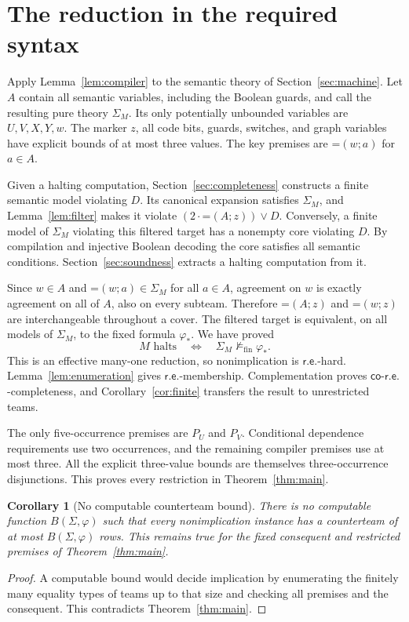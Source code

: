 \documentclass[11pt,a4paper]{article}
\newcommand{\dep}[2]{\mathord{=}(#1;#2)}
\newcommand{\fin}{\mathrm{fin}}
\newcommand{\RE}{\mathsf{r.e.}}
\newcommand{\coRE}{\mathsf{co\text{-}r.e.}}
\newtheorem{corollary}[theorem]{Corollary}
\theoremstyle{definition}
\begin{document}
\section{The reduction in the required syntax}
\label{sec:reduction}
Apply Lemma~\ref{lem:compiler} to the semantic theory of
Section~\ref{sec:machine}. Let $A$ contain all semantic variables,
including the Boolean guards, and call the resulting pure theory
$\Sigma_M$. Its only potentially unbounded variables are
$U,V,X,Y,w$. The marker $z$, all code bits, guards, switches, and
graph variables have explicit bounds of at most three values.
The key premises are $\dep w a$ for $a\in A$.

Given a halting computation, Section~\ref{sec:completeness} constructs
a finite semantic model violating $D$. Its canonical expansion
satisfies $\Sigma_M$, and Lemma~\ref{lem:filter} makes it violate
$(2\cdot\dep Az)\vee D$.
Conversely, a finite model of $\Sigma_M$ violating this filtered
target has a nonempty core violating $D$. By compilation and
injective Boolean decoding the core satisfies all semantic
conditions. Section~\ref{sec:soundness} extracts a halting
computation from it.

Since $w\in A$ and $\dep w a\in\Sigma_M$ for all $a\in A$, agreement on $w$
is exactly agreement on all of $A$, also on every subteam. Therefore
$\dep Az$ and $\dep wz$ are interchangeable throughout a cover.
The filtered target is equivalent, on all models of $\Sigma_M$,
to the fixed formula $\varphi_*$. We have proved
\[
 M\text{ halts}
 \quad\Longleftrightarrow\quad
 \Sigma_M\not\models_{\fin}\varphi_*.
\]
This is an effective many-one reduction, so nonimplication is
$\RE$-hard. Lemma~\ref{lem:enumeration} gives $\RE$-membership.
Complementation proves $\coRE$-completeness, and
Corollary~\ref{cor:finite} transfers the result to unrestricted teams.

The only five-occurrence premises are $P_U$ and $P_V$. Conditional
dependence requirements use two occurrences, and the remaining compiler premises use
at most three. All the explicit three-value bounds are themselves
three-occurrence disjunctions. This proves every restriction in
Theorem~\ref{thm:main}.

\begin{corollary}[No computable counterteam bound]
\label{cor:no-bound}
There is no computable function $B(\Sigma,\varphi)$ such that every
nonimplication instance has a counterteam of at most
$B(\Sigma,\varphi)$ rows. This remains true for the fixed consequent
and restricted premises of Theorem~\ref{thm:main}.
\end{corollary}
\begin{proof}
A computable bound would decide implication by enumerating the
finitely many equality types of teams up to that size and checking
all premises and the consequent. This contradicts
Theorem~\ref{thm:main}.
\end{proof}
\end{document}
